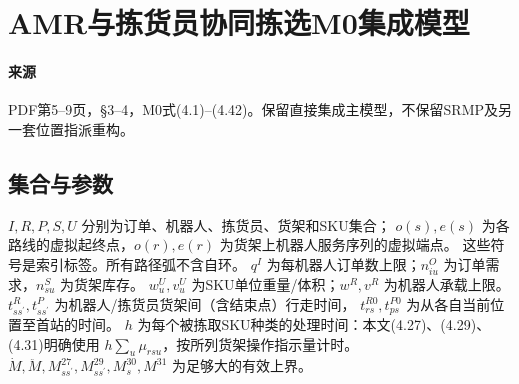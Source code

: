 \documentclass[UTF8,11pt]{ctexart}
\begin{document}
\section*{AMR与拣货员协同拣选M0集成模型}

\paragraph{来源} PDF第5--9页，§3--4，M0式(4.1)--(4.42)。保留直接集成主模型，不保留SRMP及另一套位置指派重构。
\subsection*{集合与参数}
$I,R,P,S,U$ 分别为订单、机器人、拣货员、货架和SKU集合；
$o(s),e(s)$ 为各路线的虚拟起终点，$o(r),e(r)$ 为货架上机器人服务序列的虚拟端点。
这些符号是索引标签。所有路径弧不含自环。
$q^I$ 为每机器人订单数上限；$n^O_{iu}$ 为订单需求，$n^S_{su}$ 为货架库存。
$w^U_u,v^U_u$ 为SKU单位重量/体积；$w^R,v^R$ 为机器人承载上限。
$t^R_{ss^{\prime}},t^P_{ss^{\prime}}$ 为机器人/拣货员货架间（含结束点）行走时间，
$t^{R0}_{rs},t^{P0}_{ps}$ 为从各自当前位置至首站的时间。
$h$ 为每个被拣取SKU种类的处理时间：本文(4.27)、(4.29)、(4.31)明确使用
$h\sum_u\mu_{rsu}$，按所列货架操作指示量计时。
$\dot M,\ddot M,M^{27}_{ss^{\prime}},M^{29}_{ss^{\prime}},M^{30}_s,M^{31}$ 为足够大的有效上界。
\end{document}
